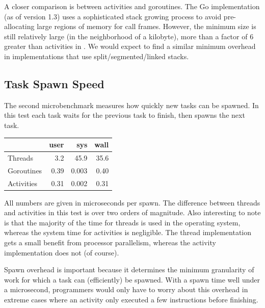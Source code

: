 \documentclass[9pt,preprint]{sigplanconf}
\begin{document}
A closer comparison is between activities and goroutines.
The Go implementation (as of version 1.3) uses a sophisticated stack growing process to avoid pre-allocating large regions of memory for call frames.
However, the minimum size is still relatively large (in the neighborhood of a kilobyte), more than a factor of 6 greater than activities in \charcoal{}.
We would expect to find a similar minimum overhead in implementations that use split/segmented/linked stacks.


\subsection{Task Spawn Speed}


The second microbenchmark measures how quickly new tasks can be spawned.
In this test each task waits for the previous task to finish, then spawns the next task.

\vspace{1em}
\begin{tabular}{|l|r|r|r|}
  \hline
   & user & sys & wall \\
  \hline
  \hline
  Threads & 3.2 & 45.9 & 35.6 \\
  \hline
  Goroutines & 0.39 & 0.003 & 0.40 \\
  \hline
  Activities & 0.31 & 0.002 & 0.31 \\
  \hline
\end{tabular}
\vspace{1em}

All numbers are given in microseconds per spawn.
The difference between threads and activities in this test is over two orders of magnitude.
Also interesting to note is that the majority of the time for threads is used in the operating system, whereas the system time for activities is negligible.
The thread implementation gets a small benefit from processor parallelism, whereas the activity implementation does not (of course).

Spawn overhead is important because it determines the minimum granularity of work for which a task can (efficiently) be spawned.
With a spawn time well under a microsecond, programmers would only have to worry about this overhead in extreme cases where an activity only executed a few instructions before finishing.
\end{document}
